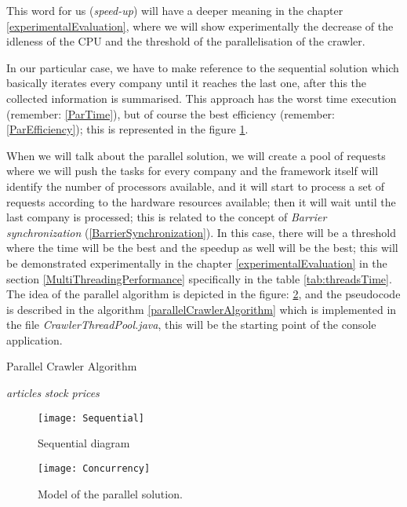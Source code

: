 This word for us (\emph{speed-up}) will have a deeper meaning in the chapter \ref{experimentalEvaluation}, where we will show experimentally the decrease of the idleness of the CPU and the threshold of the parallelisation of the crawler.

In our particular case, we have to make reference to the sequential solution which basically iterates every company until it reaches the last one, after this the collected information is summarised. This approach has the worst time execution (remember: \ref{ParTime}), but of course the best efficiency (remember: \ref{ParEfficiency}); this is represented in the figure \ref{fig:Sequential_1}.

When we will talk about the parallel solution, we will create a pool of requests where we will push the tasks for every company and the framework itself will identify the number of processors available, and it will start to process a set of requests according to the hardware resources available; then it will wait until the last company is processed; this is related to the concept of \emph{Barrier synchronization} (\ref{BarrierSynchronization}). In this case, there will be a threshold where the time will be the best and the speedup as well will be the best; this will be demonstrated experimentally in the chapter \ref{experimentalEvaluation} in the section \ref{MultiThreadingPerformance} specifically in the table \ref{tab:threadsTime}. The idea of the parallel algorithm is depicted in the figure: \ref{fig:Concurrency_1}, and the pseudocode is described in the algorithm \ref{parallelCrawlerAlgorithm} which is implemented in the file \emph{CrawlerThreadPool.java}, this will be the starting point of the console application.

\begin{algorithm}
\caption{Parallel Crawler Algorithm}\label{parallelCrawlerAlgorithm}
\begin{algorithmic}[1]
\STATE {}
\STATE {}
	\STATE {}
\ENDFOR
\STATE {}
\STATE {} \textit{articles}\text{;}
\STATE {} \textit{stock prices}\text{;}
\end{algorithmic}
\end{algorithm}


\begin{figure}\centering
	\texttt{[image: Sequential]}
	\caption{Sequential diagram}\label{fig:Sequential_1}
\end{figure}

\begin{figure}\centering
	\texttt{[image: Concurrency]}
	\caption{Model of the parallel solution.}\label{fig:Concurrency_1}
\end{figure}


